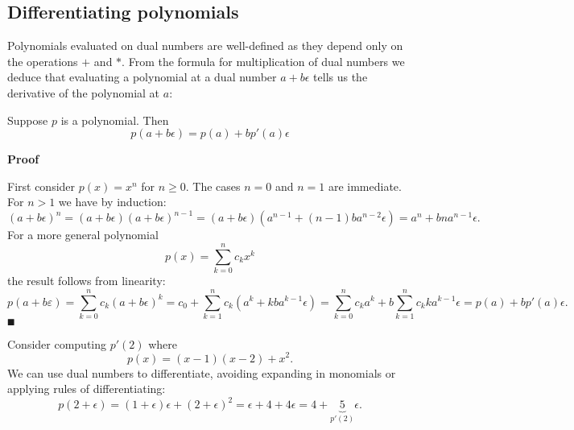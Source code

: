 \subsection{Differentiating polynomials}
Polynomials evaluated on dual numbers are well-defined as they depend only on the operations $+$ and $*$. From the formula for multiplication of dual numbers we deduce that evaluating a polynomial at a dual number $a + b \ensuremath{\epsilon}$ tells us the derivative of the polynomial at $a$:

\begin{theorem} Suppose $p$ is a polynomial. Then
\[
p(a + b \ensuremath{\epsilon}) = p(a) + b p'(a) \ensuremath{\epsilon}
\]
\end{theorem}
\textbf{Proof}

First consider $p(x) = x^n$ for $n \ensuremath{\geq} 0$.  The cases $n = 0$ and $n = 1$ are immediate. For $n > 1$ we have by induction:
\[
(a + b \ensuremath{\epsilon})^n = (a + b \ensuremath{\epsilon}) (a + b \ensuremath{\epsilon})^{n-1} = (a + b \ensuremath{\epsilon}) (a^{n-1} + (n-1) b a^{n-2} \ensuremath{\epsilon}) = a^n + b n a^{n-1} \ensuremath{\epsilon}.
\]
For a more general polynomial
\[
p(x) = \ensuremath{\sum}_{k=0}^n c_k x^k
\]
the result follows from linearity:
\[
p(a + b \ensuremath{\varepsilon}) = \ensuremath{\sum}_{k=0}^n c_k (a+b\ensuremath{\epsilon})^k = c_0 + \ensuremath{\sum}_{k=1}^n c_k (a^k +k b a^{k-1}\ensuremath{\epsilon})
= \ensuremath{\sum}_{k=0}^n c_k a^k + b \ensuremath{\sum}_{k=1}^n c_k k a^{k-1}\ensuremath{\epsilon} = p(a) + b p'(a) \ensuremath{\epsilon}.
\]
\ensuremath{\QED}

\begin{example} Consider computing $p'(2)$ where
\[
p(x) = (x-1)(x-2) + x^2.
\]
We can use dual numbers to differentiate, avoiding expanding in monomials or applying rules of differentiating:
\[
p(2+\ensuremath{\epsilon}) = (1+\ensuremath{\epsilon})\ensuremath{\epsilon} + (2+\ensuremath{\epsilon})^2 = \ensuremath{\epsilon} + 4 + 4\ensuremath{\epsilon} = 4 + \underbrace{5}_{p'(2)}\ensuremath{\epsilon}.
\]
\end{example}

